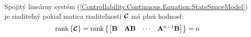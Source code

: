 \documentclass[a4paper, 10pt, ]{article}
\begin{document}
\begin{theorem}
    Spojitý lineárny systém (\ref{Controllability.Continuous.Equation:StateSpaceModel}) je riaditeľný pokiaľ matica riaditeľnosti $\boldsymbol{\mathcal{C}}$ má plnú hodnosť:
    \begin{equation}
        \label{Controllability.Continuous.Equation:ControllabilityTheorem}
        \mathrm{rank} \left\{ \boldsymbol{\mathcal{C}} \right\} = 
        \mathrm{rank} \left\{
            \begin{bmatrix}
                \mathbf{B} & \mathbf{A} \mathbf{B} & \cdots & \mathbf{A}^{n - 1} \mathbf{B}
            \end{bmatrix}
        \right\} = 
        n
    \end{equation}
\end{theorem}
\end{document}
